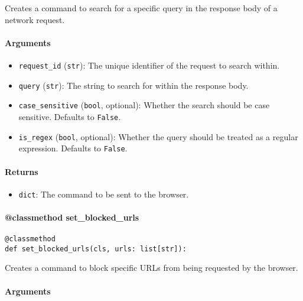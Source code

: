 \documentclass{article}
\begin{document}
\noindent Creates a command to search for a specific query in the response body of a network request.

\paragraph{Arguments}

\begin{itemize}
    \item \lstinline[style=pythonstyle]|request_id| (\lstinline[style=pythonstyle]|str|): The unique identifier of the request to search within.
    \item \lstinline[style=pythonstyle]|query| (\lstinline[style=pythonstyle]|str|): The string to search for within the response body.
    \item \lstinline[style=pythonstyle]|case_sensitive| (\lstinline[style=pythonstyle]|bool|, optional): Whether the search should be case sensitive. Defaults to \lstinline[style=pythonstyle]|False|.
    \item \lstinline[style=pythonstyle]|is_regex| (\lstinline[style=pythonstyle]|bool|, optional): Whether the query should be treated as a regular expression. Defaults to \lstinline[style=pythonstyle]|False|.
\end{itemize}

\paragraph{Returns}

\begin{itemize}
    \item \lstinline[style=pythonstyle]|dict|: The command to be sent to the browser.
\end{itemize}

\paragraph{@classmethod set\_blocked\_urls}

\begin{lstlisting}[style=pythonstyle]
@classmethod
def set_blocked_urls(cls, urls: list[str]):
\end{lstlisting}

\noindent Creates a command to block specific URLs from being requested by the browser.

\paragraph{Arguments}
\end{document}

